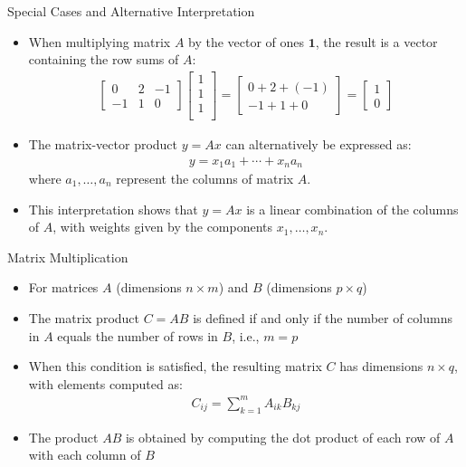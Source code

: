 \begin{frame}{Special Cases and Alternative Interpretation}
\begin{itemize}
    \item When multiplying matrix $A$ by the vector of ones $\boldsymbol{1}$, the result is a vector containing the row sums of $A$:
    \begin{align*}
        \begin{bmatrix}
            0 & 2 & -1\\
            -1 & 1 & 0 
        \end{bmatrix}\begin{bmatrix}
            1\\
            1\\
            1\\
        \end{bmatrix} = \begin{bmatrix}
            0 + 2 + (-1)\\
            -1 + 1 + 0 
        \end{bmatrix} = \begin{bmatrix}
            1\\0
        \end{bmatrix}
    \end{align*}
    \item The matrix-vector product $y=Ax$ can alternatively be expressed as:
    \begin{align*}
        y = x_1 a_1 + \cdots + x_n a_n
    \end{align*}
    where $a_1, \ldots, a_n$ represent the columns of matrix $A$.
\end{itemize}
\end{frame}
\begin{frame}
    \begin{itemize}
        \item This interpretation shows that $y=Ax$ is a linear combination of the columns of $A$, with weights given by the components $x_1, \ldots, x_n$.
    \end{itemize}
\end{frame}



\begin{frame}{Matrix Multiplication}
\begin{itemize}
    \item For matrices $A$ (dimensions $n \times m$) and $B$ (dimensions $p \times q$)
    \item The matrix product $C = AB$ is defined if and only if the number of columns in $A$ equals the number of rows in $B$, i.e., $m = p$
    \item When this condition is satisfied, the resulting matrix $C$ has dimensions $n \times q$, with elements computed as:
    \begin{align}
        C_{ij} = \sum_{k=1}^m A_{ik} B_{kj}
    \end{align}
    \item The product $AB$ is obtained by computing the dot product of each row of $A$ with each column of $B$
\end{itemize}    
\end{frame}



